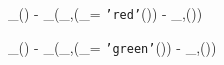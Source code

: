 
\pi_{\sid}(\Suppliers) - \pi_{\sid}(\pi_{\sid,\pid}(\Suppliers \times \sigma_{\mycolor = \texttt{'red'}}(\Parts)) - \pi_{\sid,\pid}(\Catalog))

\cup

\pi_{\sid}(\Suppliers) - \pi_{\sid}(\pi_{\sid,\pid}(\Suppliers \times \sigma_{\mycolor = \texttt{'green'}}(\Parts)) - \pi_{\sid,\pid}(\Catalog))
